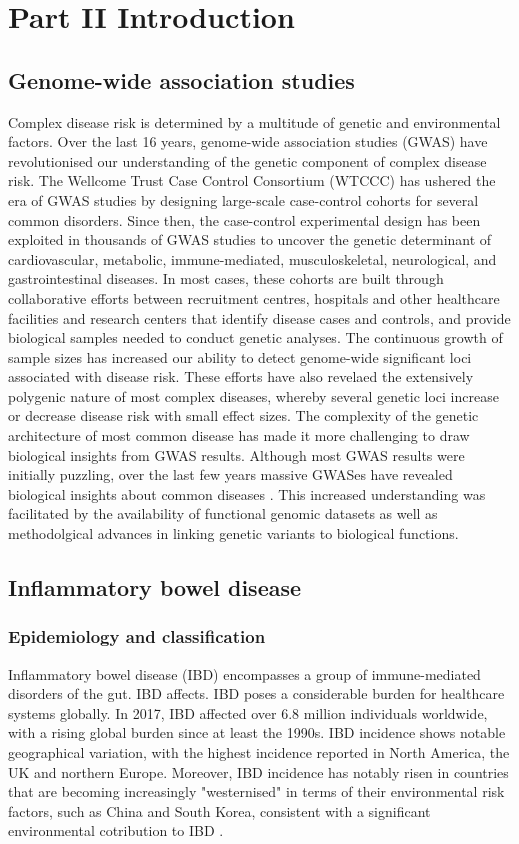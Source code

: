 \section{Part II Introduction}
\subsection{Genome-wide association studies}
Complex disease risk is determined by a multitude of genetic and environmental factors. Over the last 16 years, genome-wide association studies (GWAS) have revolutionised our understanding of the genetic component of complex disease risk. The Wellcome Trust Case Control Consortium (WTCCC) has ushered the era of GWAS studies by designing large-scale case-control cohorts for several common disorders. Since then, the case-control experimental design has been exploited in thousands of GWAS studies to uncover the genetic determinant of cardiovascular, metabolic, immune-mediated, musculoskeletal, neurological, and gastrointestinal diseases. In most cases, these cohorts are built through collaborative efforts between recruitment centres, hospitals and other healthcare facilities and research centers that identify disease cases and controls, and provide biological samples needed to conduct genetic analyses. The continuous growth of sample sizes has increased our ability to detect genome-wide significant loci associated with disease risk. These efforts have also revelaed the extensively polygenic nature of most complex diseases, whereby several genetic loci increase or decrease disease risk with small effect sizes. The complexity of the genetic architecture of most common disease has made it more challenging to draw biological insights from GWAS results. Although most GWAS results were initially puzzling, over the last few years massive GWASes have revealed biological insights about common diseases \cite{Xue2018-ni,Aragam2022-ep}. This increased understanding was facilitated by the availability of functional genomic datasets as well as methodolgical advances in linking genetic variants to biological functions. 

\subsection{Inflammatory bowel disease}
\subsubsection{Epidemiology and classification}
Inflammatory bowel disease (IBD) encompasses a group of immune-mediated disorders of the gut. IBD affects. IBD poses a considerable burden for healthcare systems globally. In 2017, IBD affected over 6.8 million individuals worldwide, with a rising global burden since at least the 1990s. IBD incidence shows notable geographical variation, with the highest incidence reported in North America, the UK and northern Europe. Moreover, IBD incidence has notably risen in countries that are becoming increasingly "westernised" in terms of their environmental risk factors, such as China and South Korea, consistent with a significant environmental cotribution to IBD \cite{Ng2013-of}.\\

